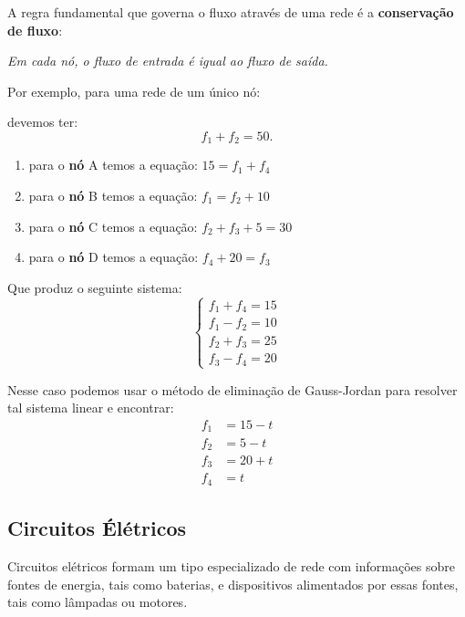 A regra fundamental que governa o fluxo através de uma rede é a \textbf{conservação de fluxo}:

\begin{definicao}
  \textit{Em cada nó, o fluxo de entrada é igual ao fluxo de saída.}
\end{definicao}

Por exemplo, para uma rede de um único nó:
\begin{figure}[!h]
    \centering
    
\end{figure}
devemos ter:
\[
    f_1 + f_2 = 50.
\]

\begin{figure}[!h]
    \centering
    
\end{figure}

\begin{enumerate}[label={\roman*})]
    \item para o \textbf{nó} A temos a equação: $15 = f_1 + f_4$
    \item para o \textbf{nó} B temos a equação: $f_1 = f_2 + 10$
    \item para o \textbf{nó} C temos a equação: $f_2 + f_3 + 5 = 30$
    \item para o \textbf{nó} D temos a equação: $f_4 + 20 = f_3$
\end{enumerate}

Que produz o seguinte sistema:
\[
    \begin{cases}
        f_1 + f_4 = 15\\
        f_1 - f_2 = 10\\
        f_2 + f_3 = 25\\
        f_3 - f_4 = 20
    \end{cases}
\]

Nesse caso podemos usar o método de eliminação de Gauss-Jordan para resolver tal sistema linear e encontrar:
\begin{align*}
    f_1 &= 15 - t\\
    f_2 &= 5 - t\\
    f_3 &= 20 + t\\
    f_4 &= t
\end{align*}

\subsection{Circuitos Élétricos}

Circuitos elétricos formam um tipo especializado de rede com informações sobre fontes de energia, tais como baterias, e dispositivos alimentados por essas fontes, tais como lâmpadas ou motores.

